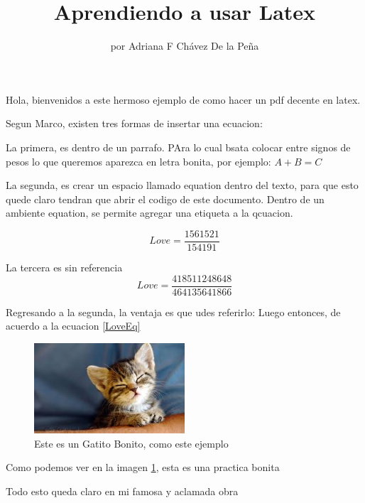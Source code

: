 \documentclass[letterpaper]{article}
\begin{document}
\title{Aprendiendo a usar Latex}
\author{por Adriana F Chávez De la Peña}
\maketitle
Hola, bienvenidos a este hermoso ejemplo de como hacer un pdf decente en latex.



Segun Marco, existen tres formas de insertar una ecuacion:



La primera, es dentro de un parrafo. PAra lo cual bsata colocar entre signos de pesos lo que queremos aparezca en letra bonita, por ejemplo: $A+B=C$


 
La segunda, es crear un espacio llamado equation dentro del texto, para que esto quede claro tendran que abrir el codigo de este documento. Dentro de un ambiente equation, se permite agregar una etiqueta a la qcuacion.

\begin{equation}
Love=\frac{1561521}{154191}
\label{LoveEq}
\end{equation}

La tercera es sin referencia
\[Love=\frac{418511248648}{464135641866}\]


Regresando a la segunda, la ventaja es que udes referirlo: Luego entonces, de acuerdo a la ecuacion \ref{LoveEq}

\begin{figure}
\centering
\includegraphics[width=0.5\textwidth]{Imagenes/Gatitos.jpeg}
\caption{Este es un Gatito Bonito, como este ejemplo}
\label{Gatito1}
\end{figure}




Como podemos ver en la imagen \ref{Gatito1}, esta es una practica bonita  \cite{chavez2016}





Todo esto queda claro en mi famosa y aclamada obra \citep{chavez2016}



\end{document}
